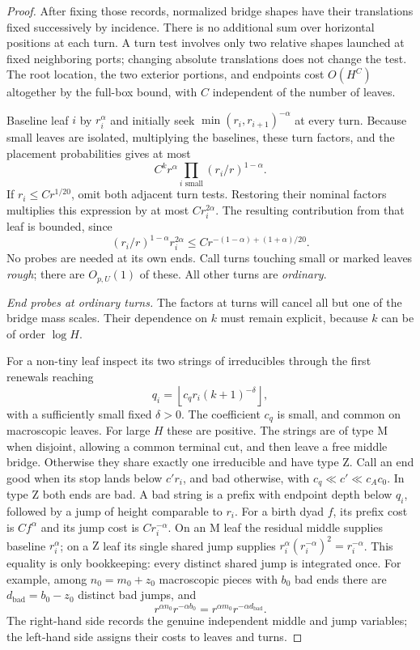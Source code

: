 \begin{proof}
After fixing those records, normalized bridge shapes have their
translations fixed successively by incidence. There is no additional
sum over horizontal positions at each turn. A turn test involves only
two relative shapes launched at fixed neighboring ports; changing
absolute translations does not change the test. The root location,
the two exterior portions, and endpoints cost $O(H^C)$ altogether by
the full-box bound, with $C$ independent of the number of leaves.

Baseline leaf $i$ by $r_i^\alpha$ and initially seek
$\min(r_i,r_{i+1})^{-\alpha}$ at every turn. Because small leaves are
isolated, multiplying the baselines, these turn factors, and the
placement probabilities gives at most
\[
 C^k r^\alpha\prod_{i\text{ small}}(r_i/r)^{1-\alpha}.
\]
If $r_i\le Cr^{1/20}$, omit both adjacent turn tests. Restoring their
nominal factors multiplies this expression by at most $Cr_i^{2\alpha}$.
The resulting contribution from that leaf is bounded, since
\[
 (r_i/r)^{1-\alpha}r_i^{2\alpha}
 \le C r^{-(1-\alpha)+(1+\alpha)/20}.
\]
No probes are needed at its own ends. Call turns touching small or
marked leaves \emph{rough}; there are $O_{p,U}(1)$ of these. All other
turns are \emph{ordinary}.

\smallskip\noindent\emph{End probes at ordinary turns.}
The factors at turns will cancel all but one of the bridge mass scales.
Their dependence on $k$ must remain explicit, because $k$ can be of
order $\log H$.

For a non-tiny leaf inspect its two strings of irreducibles through
the first renewals reaching
\[
 q_i=\left\lfloor c_qr_i(k+1)^{-\delta}\right\rfloor,
\]
with a sufficiently small fixed $\delta>0$. The coefficient $c_q$ is
small, and common on macroscopic leaves. For large $H$ these are
positive. The strings are of type $\mathrm M$ when disjoint, allowing
a common terminal cut, and then leave a free middle bridge. Otherwise
they share exactly one irreducible and have type $\mathrm Z$. Call an
end good when its stop lands below $c'r_i$, and bad otherwise, with
$c_q\ll c'\ll c_Ac_0$. In type $\mathrm Z$ both ends are bad.
A bad string is a prefix with endpoint depth below $q_i$, followed by
a jump of height comparable to $r_i$. For a birth dyad $f$, its prefix
cost is $Cf^\alpha$ and its jump cost is $Cr_i^{-\alpha}$. On an
$\mathrm M$ leaf the residual middle supplies baseline $r_i^\alpha$;
on a $\mathrm Z$ leaf its single shared jump supplies
$r_i^\alpha(r_i^{-\alpha})^2=r_i^{-\alpha}$. This equality is only
bookkeeping: every distinct shared jump is integrated once.
For example, among $n_0=m_0+z_0$ macroscopic pieces with $b_0$ bad
ends there are $d_{\mathrm{bad}}=b_0-z_0$ distinct bad jumps, and
\[
 r^{\alpha n_0}r^{-\alpha b_0}
       =r^{\alpha m_0}r^{-\alpha d_{\mathrm{bad}}}.
\]
The right-hand side records the genuine independent middle and jump
variables; the left-hand side assigns their costs to leaves and turns.


\end{proof}
